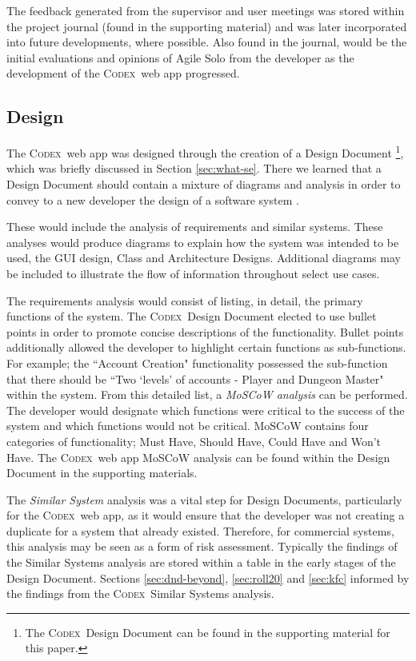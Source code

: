 \documentclass[final]{cmpreport}
\newcommand{\Codex}{\textsc{Codex}}
\begin{document}
		The feedback generated from the supervisor and user meetings was stored within the project journal (found in the supporting material) and was later incorporated into future developments, where possible. Also found in the journal, would be the initial evaluations and opinions of Agile Solo from the developer as the development of the \Codex \ web app progressed. 
		
		\subsection{Design} \label{sec:design}
		The \Codex \ web app was designed through the creation of a Design Document \footnote{The \Codex \ Design Document can be found in the supporting material for this paper.}, which was briefly discussed in Section \ref{sec:what-se}. There we learned that a Design Document should contain a mixture of diagrams and analysis in order to convey to a new developer the design of a software system \citep{DesignDocExample}.
		
		These would include the analysis of requirements and similar systems. These analyses would produce diagrams to explain how the system was intended to be used, the GUI design, Class and Architecture Designs. Additional diagrams may be included to illustrate the flow of information throughout select use cases.
		
		The requirements analysis would consist of listing, in detail, the primary functions of the system. The \Codex \ Design Document elected to use bullet points in order to promote concise descriptions of the functionality. Bullet points additionally allowed the developer to highlight certain functions as sub-functions. For example; the ``Account Creation" functionality possessed the sub-function that there should be ``Two `levels' of accounts - Player and Dungeon Master" within the system. From this detailed list, a \emph{MoSCoW analysis} can be performed. The developer would designate which functions were critical to the success of the system and which functions would not be critical. MoSCoW contains four categories of functionality; Must Have, Should Have, Could Have and Won't Have. The \Codex \ web app MoSCoW analysis can be found within the Design Document in the supporting materials.
		
		The \emph{Similar System} analysis was a vital step for Design Documents, particularly for the \Codex \ web app, as it would ensure that the developer was not creating a duplicate for a system that already existed. Therefore, for commercial systems, this analysis may be seen as a form of risk assessment. Typically the findings of the Similar Systems analysis are stored within a table in the early stages of the Design Document. Sections \ref{sec:dnd-beyond}, \ref{sec:roll20} and \ref{sec:kfc} informed by the findings from the \Codex \ Similar Systems analysis. 
		
\end{document}
